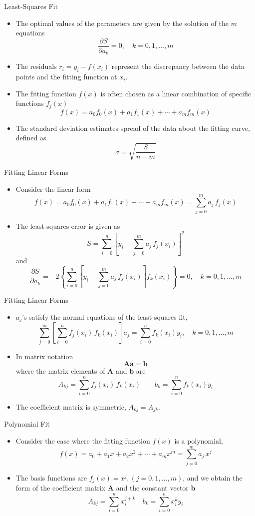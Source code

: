 \documentclass{beamer}
\begin{document}
\begin{frame}{Least-Squares Fit}
\begin{itemize}
\item The optimal values of the parameters are given by the solution of the $m$ equations
\[
\frac{\partial S}{\partial a_k}=0,\quad k=0,1,\ldots,m
\]
\item The \alert{residuals} $r_i=y_i-f(x_i)$ represent the discrepancy between the data points and the fitting function at $x_i$.
\item The fitting function $f(x)$ is often chosen as a linear combination of specific functions $f_j(x)$
\[
f(x)=a_0 f_0(x)+a_1 f_1(x) + \cdots+ a_m f_m(x)
\]
\item The \alert{standard deviation} estimates spread of the data about the fitting curve, defined as
\[
\sigma=\sqrt{\frac{S}{n-m}}
\] 
\end{itemize}
\end{frame}
\begin{frame}{Fitting Linear Forms}
\begin{itemize} 
\item Consider the linear form 
\[
f(x)=a_0 f_0(x)+a_1 f_1(x) + \cdots+ a_m f_m(x)= 
\sum_{j=0}^m a_j \,f_j(x)
\]
\item The least-squares error is given as
\[
S=\sum_{i=0}^n \left[y_i-\sum_{j=0}^m a_j \,f_j(x_i) \right]^2
\]
and 
\[
\frac{\partial S}{\partial a_k}=-2\left\{\sum_{i=0}^n \left[ y_i -\sum_{j=0}^m a_j \,f_j(x_i)\right] f_k(x_i)\right\}=0,\quad k=0,1,\ldots,m
\]
\end{itemize}
\end{frame}
\begin{frame}{Fitting Linear Forms}
\begin{itemize} 
\item $a_j$'s satisfy the \alert{normal equations} of the least-squares fit, 
\[
\sum_{j=0}^m \left[\sum_{i=0}^n f_j(x_i)\, f_k(x_i)\right] a_j =\sum_{i=0}^n f_k(x_i) y_i, \quad k=0,1,\ldots,m
\]
\item In matrix notation
\[
\mathbf{Aa}=\mathbf{b}
\]
where the matrix elements of $\mathbf{A}$ and $\mathbf{b}$ are
\[
A_{kj}=\sum_{i=0}^n f_j(x_i)\, f_k (x_i)\quad\quad b_k =\sum_{i=0}^n f_k(x_i) y_i
\]
\item The coefficient matrix is symmetric, $A_{kj}=A_{jk}$.
\end{itemize}
\end{frame}
\begin{frame}{Polynomial Fit}
\begin{itemize}
\item Consider the case where the fitting function $f(x)$ is a polynomial, 
\[
f(x)=a_0+a_1x+a_2x^2+\cdots+a_m x^m =\sum_{j=0}^m a_j \,x^j
\]
\item The basis functions are $f_j(x)=x^j, (j=0, 1, \ldots,m)$, and we obtain the form of the coefficient matrix $\mathbf{A}$ and the constant 
vector $\mathbf{b}$ 
\[
A_{kj}=\sum_{i=0}^n x_i ^{j+k}\quad b_k=\sum_{i=0}^n x_i^k y_i
\]
\end{itemize}
\end{frame}
\end{document}
